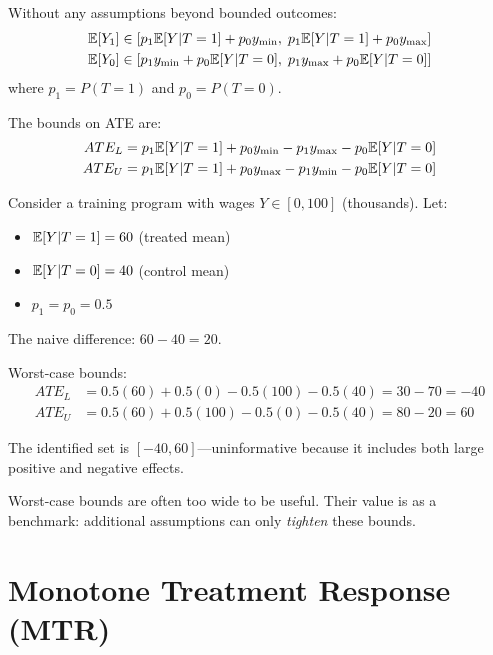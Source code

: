 \begin{theorem}
\label{thm:manski_worst}
Without any assumptions beyond bounded outcomes:
\begin{align}
\mathbb{E}[Y_1] &\in [p_1 \mathbb{E}[Y|T=1] + p_0 y_{\min}, \; p_1 \mathbb{E}[Y|T=1] + p_0 y_{\max}] \\
\mathbb{E}[Y_0] &\in [p_1 y_{\min} + p_0 \mathbb{E}[Y|T=0], \; p_1 y_{\max} + p_0 \mathbb{E}[Y|T=0]]
\end{align}
where $p_1 = P(T=1)$ and $p_0 = P(T=0)$.

The bounds on ATE are:
\begin{align}
ATE_L &= p_1 \mathbb{E}[Y|T=1] + p_0 y_{\min} - p_1 y_{\max} - p_0 \mathbb{E}[Y|T=0] \label{eq:worst_lower} \\
ATE_U &= p_1 \mathbb{E}[Y|T=1] + p_0 y_{\max} - p_1 y_{\min} - p_0 \mathbb{E}[Y|T=0] \label{eq:worst_upper}
\end{align}
\end{theorem}

\begin{example}
Consider a training program with wages $Y \in [0, 100]$ (thousands). Let:
\begin{itemize}
    \item $\mathbb{E}[Y|T=1] = 60$ (treated mean)
    \item $\mathbb{E}[Y|T=0] = 40$ (control mean)
    \item $p_1 = p_0 = 0.5$
\end{itemize}

The naive difference: $60 - 40 = 20$.

Worst-case bounds:
\begin{align*}
ATE_L &= 0.5(60) + 0.5(0) - 0.5(100) - 0.5(40) = 30 - 70 = -40 \\
ATE_U &= 0.5(60) + 0.5(100) - 0.5(0) - 0.5(40) = 80 - 20 = 60
\end{align*}

The identified set is $[-40, 60]$---uninformative because it includes both large positive and negative effects.
\end{example}

\begin{remark}
Worst-case bounds are often too wide to be useful. Their value is as a benchmark: additional assumptions can only \emph{tighten} these bounds.
\end{remark}


\section{Monotone Treatment Response (MTR)}
\label{sec:manski_mtr}

